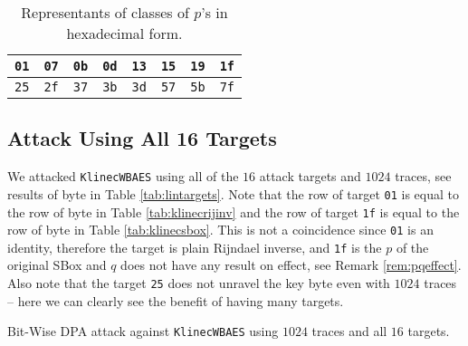 \begin{table}[h]
	\begin{center}
	\begin{tabular}{| c | c | c | c | c | c | c | c |}
		\hline
		{\tt 01} & {\tt 07} & {\tt 0b} & {\tt 0d} & {\tt 13} & {\tt 15} & {\tt 19} & {\tt 1f} \\
		\hline
		{\tt 25} & {\tt 2f} & {\tt 37} & {\tt 3b} & {\tt 3d} & {\tt 57} & {\tt 5b} & {\tt 7f} \\
		\hline
	\end{tabular}
	\end{center}
\caption{Representants of classes of $p$'s in hexadecimal form.}
\label{tab:classrepre}
\end{table}



\subsection{Attack Using All 16 Targets}

We attacked {\tt KlinecWBAES} using all of the $16$ attack targets and $1024$ traces, see results of  byte in Table \ref{tab:lintargets}. Note that the row of target {\tt 01} is equal to the row of  byte in Table \ref{tab:klinecrijinv} and the row of target {\tt 1f} is equal to the row of  byte in Table \ref{tab:klinecsbox}. This is not a coincidence since {\tt 01} is an identity, therefore the target is plain Rijndael inverse, and {\tt 1f} is the $p$ of the original SBox and $q$ does not have any result on effect, see Remark \ref{rem:pqeffect}. Also note that the target {\tt 25} does not unravel the  key byte even with $1024$ traces -- here we can clearly see the benefit of having many targets.

\begin{landscape}
\begin{table}[H]
	\begin{center}
	
	\end{center}
\caption{Bit-Wise DPA attack against {\tt KlinecWBAES} using $1024$ traces and all $16$ targets.}
\label{tab:lintargets}
\end{table}
\end{landscape}


